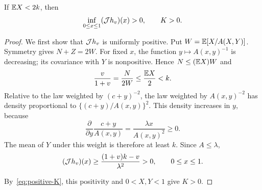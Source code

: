 \begin{lemma}\label{lem:weighted-positivity}
If $\mathbb E X<2k$, then
\begin{equation*}
 \inf_{0\le x\le1}(\mathcal J h_v)(x)>0,\qquad K>0.
\end{equation*}
\end{lemma}

\begin{proof}
We first show that $\mathcal J h_v$ is uniformly positive. Put $W=\mathbb E[X/A(X,Y)]$. Symmetry gives $N+Z=2W$. For fixed $x$, the function $y\mapsto A(x,y)^{-1}$ is decreasing; its covariance with $Y$ is nonpositive. Hence $N\le(\mathbb E X)W$ and
\begin{equation}\label{eq:weighted-speed}
 \frac{v}{1+v}=\frac{N}{2W}\le\frac{\mathbb E X}{2}<k.
\end{equation}
Relative to the law weighted by $(c+y)^{-2}$, the law weighted by $A(x,y)^{-2}$ has density proportional to $\{(c+y)/A(x,y)\}^2$. This density increases in $y$, because
\begin{equation*}
 \frac{\partial}{\partial y}\frac{c+y}{A(x,y)}
 =\frac{\lambda x}{A(x,y)^2}\ge0.
\end{equation*}
The mean of $Y$ under this weight is therefore at least $k$. Since $A\le\lambda$,
\begin{equation}\label{eq:J-positive}
 (\mathcal J h_v)(x)\ge\frac{(1+v)k-v}{\lambda^2}>0,
 \qquad 0\le x\le1.
\end{equation}

By~\eqref{eq:positive-K}, this positivity and $0<X,Y<1$ give $K>0$.
\end{proof}


